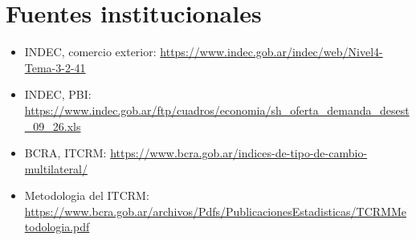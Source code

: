 \documentclass[12pt,a4paper]{article}
\begin{document}
\section{Fuentes institucionales}

\begin{itemize}[leftmargin=*]
  \item INDEC, comercio exterior:
  \url{https://www.indec.gob.ar/indec/web/Nivel4-Tema-3-2-41}
  \item INDEC, PBI:
  \url{https://www.indec.gob.ar/ftp/cuadros/economia/sh_oferta_demanda_desest_09_26.xls}
  \item BCRA, ITCRM:
  \url{https://www.bcra.gob.ar/indices-de-tipo-de-cambio-multilateral/}
  \item Metodologia del ITCRM:
  \url{https://www.bcra.gob.ar/archivos/Pdfs/PublicacionesEstadisticas/TCRMMetodologia.pdf}
\end{itemize}
\end{document}
